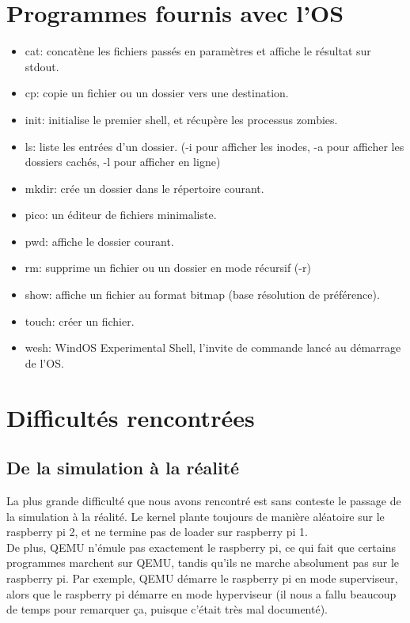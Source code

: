 \documentclass[a4paper]{article}
\begin{document}
\section{Programmes fournis avec l'OS}
\begin{itemize}
	\item cat: concatène les fichiers passés en paramètres et affiche le résultat sur stdout.
	\item cp: copie un fichier ou un dossier vers une destination.
	\item init: initialise le premier shell, et récupère les processus zombies.
	\item ls: liste les entrées d'un dossier. (-i pour afficher les inodes, -a pour afficher les dossiers cachés, -l pour afficher en ligne)
	\item mkdir: crée un dossier dans le répertoire courant.
	\item pico: un éditeur de fichiers minimaliste.
	\item pwd: affiche le dossier courant.
	\item rm: supprime un fichier ou un dossier en mode récursif (-r)
	\item show: affiche un fichier au format bitmap (base résolution de préférence).
	\item touch: créer un fichier.
	\item wesh: WindOS Experimental Shell, l'invite de commande lancé au démarrage de l'OS.
\end{itemize}

\section{Difficultés rencontrées}

\subsection{De la simulation à la réalité}

La plus grande difficulté que nous avons rencontré est sans conteste le passage
de la simulation à la réalité. Le kernel plante toujours de manière aléatoire
sur le raspberry pi 2, et ne termine pas de loader sur raspberry pi 1.\\

De plus, QEMU n'émule pas exactement le raspberry pi, ce qui fait que certains
programmes marchent sur QEMU, tandis qu'ils ne marche absolument pas sur le
raspberry pi. Par exemple, QEMU démarre le raspberry pi en mode superviseur,
alors que le raspberry pi démarre en mode hyperviseur (il nous a fallu beaucoup
de temps pour remarquer ça, puisque c'était très mal documenté).
\end{document}
